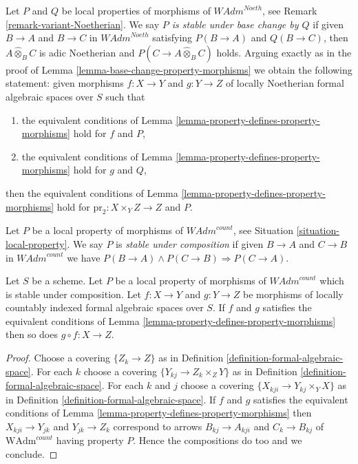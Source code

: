 \begin{remark}
\label{remark-base-change-variant-variant-Noetherian}
Let $P$ and $Q$ be local properties of morphisms of
$\textit{WAdm}^{Noeth}$, see Remark \ref{remark-variant-Noetherian}.
We say {\it $P$ is stable under base change by $Q$}
if given $B \to A$ and $B \to C$ in $\textit{WAdm}^{Noeth}$
satisfying $P(B \to A)$ and $Q(B \to C)$, then
$A \widehat{\otimes}_B C$ is adic Noetherian and
$P(C \to A \widehat{\otimes}_B C)$ holds.
Arguing exactly as in the proof of
Lemma \ref{lemma-base-change-property-morphisms}
we obtain the following statement:
given morphisms $f : X \to Y$ and $g : Y \to Z$ of
locally Noetherian formal algebraic spaces over $S$
such that
\begin{enumerate}
\item the equivalent conditions of
Lemma \ref{lemma-property-defines-property-morphisms}
hold for $f$ and $P$,
\item the equivalent conditions of
Lemma \ref{lemma-property-defines-property-morphisms}
hold for $g$ and $Q$,
\end{enumerate}
then the equivalent conditions of
Lemma \ref{lemma-property-defines-property-morphisms}
hold for $\text{pr}_2 : X \times_Y Z \to Z$ and $P$.
\end{remark}

\begin{situation}
\label{situation-composition-local-property}
Let $P$ be a local property of morphisms of $\textit{WAdm}^{count}$, see
Situation \ref{situation-local-property}. We say $P$ is {\it stable under
composition} if given $B \to A$ and $C \to B$ in $\textit{WAdm}^{count}$
we have $P(B \to A) \wedge P(C \to B) \Rightarrow P(C \to A)$.
\end{situation}

\begin{lemma}
\label{lemma-composition-property-morphisms}
Let $S$ be a scheme. Let $P$ be a local property of morphisms of
$\textit{WAdm}^{count}$ which is stable under composition.
Let $f : X \to Y$ and $g : Y \to Z$ be morphisms of locally countably indexed
formal algebraic spaces over $S$. If $f$ and $g$
satisfies the equivalent conditions of
Lemma \ref{lemma-property-defines-property-morphisms}
then so does $g \circ f : X \to Z$.
\end{lemma}

\begin{proof}
Choose a covering $\{Z_k \to Z\}$ as in
Definition \ref{definition-formal-algebraic-space}.
For each $k$ choose a covering $\{Y_{kj} \to Z_k \times_Z Y\}$
as in Definition \ref{definition-formal-algebraic-space}.
For each $k$ and $j$ choose a covering $\{X_{kji} \to Y_{kj} \times_Y X\}$
as in Definition \ref{definition-formal-algebraic-space}.
If $f$ and $g$
satisfies the equivalent conditions of
Lemma \ref{lemma-property-defines-property-morphisms}
then $X_{kji} \to Y_{jk}$ and $Y_{jk} \to Z_k$
correspond to arrows
$B_{kj} \to A_{kji}$ and $C_k \to B_{kj}$ of
$\text{WAdm}^{count}$ having property $P$.
Hence the compositions do too and we conclude.
\end{proof}

